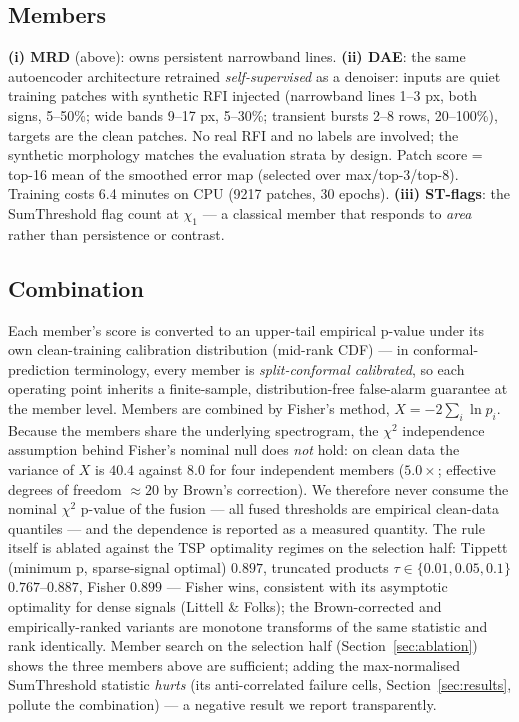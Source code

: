 \documentclass[journal]{IEEEtran}
\begin{document}
\subsection{Members}
\textbf{(i) MRD} (above): owns persistent narrowband lines.
\textbf{(ii) DAE}: the same autoencoder architecture retrained
\emph{self-supervised} as a denoiser: inputs are quiet training patches with
synthetic RFI injected (narrowband lines 1--3 px, both signs, 5--50\%;
wide bands 9--17 px, 5--30\%; transient bursts 2--8 rows, 20--100\%), targets
are the clean patches.  No real RFI and no labels are involved; the
synthetic morphology matches the evaluation strata by design.  Patch score =
top-16 mean of the smoothed error map (selected over max/top-3/top-8).
Training costs 6.4 minutes on CPU (9217 patches, 30 epochs).
\textbf{(iii) ST-flags}: the SumThreshold flag count at $\chi_1$ --- a
classical member that responds to \emph{area} rather than persistence or
contrast.

\subsection{Combination}
Each member's score is converted to an upper-tail empirical p-value under
its own clean-training calibration distribution (mid-rank CDF) --- in
conformal-prediction terminology, every member is \emph{split-conformal
calibrated}, so each operating point inherits a finite-sample,
distribution-free false-alarm guarantee at the member level.  Members are
combined by Fisher's method, $X=-2\sum_i \ln p_i$.  Because the members
share the underlying spectrogram, the $\chi^2$ independence assumption
behind Fisher's nominal null does \emph{not} hold: on clean data the
variance of $X$ is $40.4$ against $8.0$ for four independent members
($5.0\times$; effective degrees of freedom $\approx 20$ by Brown's
correction).  We therefore never consume the nominal $\chi^2$ p-value of
the fusion --- all fused thresholds are empirical clean-data quantiles ---
and the dependence is reported as a measured quantity.  The rule itself is
ablated against the TSP optimality regimes on the selection half: Tippett
(minimum p, sparse-signal optimal) $0.897$, truncated products
$\tau\in\{0.01,0.05,0.1\}$ $0.767$--$0.887$, Fisher $0.899$ --- Fisher
wins, consistent with its asymptotic optimality for dense signals
(Littell \& Folks); the Brown-corrected and empirically-ranked variants
are monotone transforms of the same statistic and rank identically.
Member search on the selection half
(Section~\ref{sec:ablation}) shows the three members above are sufficient;
adding the max-normalised SumThreshold statistic \emph{hurts} (its
anti-correlated failure cells, Section~\ref{sec:results}, pollute the
combination) --- a negative result we report transparently.
\end{document}
